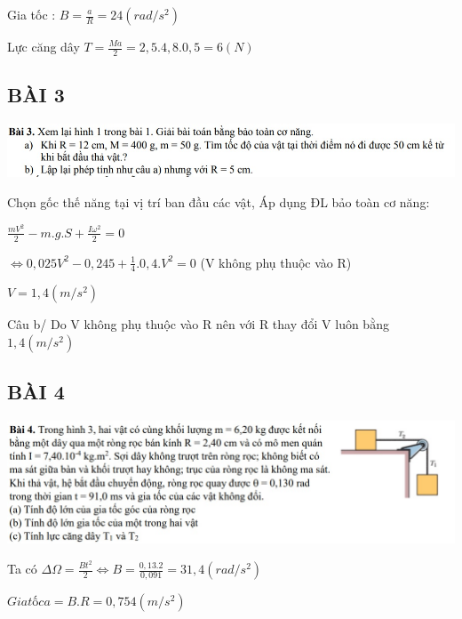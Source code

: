 \documentclass[12pt,a4paper]{article}
\begin{document}
\vspace*{1cm}
Gia tốc : $B = \frac{a}{R} = 24 (rad/s^2)$

\vspace*{1cm}
Lực căng dây $T = \frac{Ma}{2} = 2,5 . 4,8 . 0,5 = 6(N)$

\newpage
\vspace*{1cm}
\Large \subsection{\color{blue}\textbf{BÀI 3} }
\includegraphics[scale=0.80]{No4_3.jpg}

\vspace*{1cm}
Chọn gốc thế năng tại vị trí ban đầu các vật, Áp dụng ĐL bảo toàn cơ năng:

\vspace*{1cm}
$\frac{mV^2}{2} - m.g.S + \frac{I\omega^2}{2} = 0$

\vspace*{1cm}
$\Leftrightarrow 0,025V^2 - 0,245+ \frac{1}{4}.0,4.V^2 = 0$ (V không phụ thuộc vào R)

\vspace*{1cm}
$ V = 1,4 (m/s^2)$

\vspace*{1cm}
Câu b/ Do V không phụ thuộc vào R nên với R thay đổi V luôn bằng $1,4 (m/s^2)$

\Large \subsection{\color{blue}\textbf{BÀI 4} }
\includegraphics[scale=0.80]{No4_4.jpg}

\vspace*{1cm}
Ta có $\Delta\Omega =\frac{Bt^2}{2} \Leftrightarrow B = \frac{0,13 .2}{0,091} = 31,4 (rad/s^2)$

\vspace*{1cm}
$Gia tốc a = B.R = 0,754 (m/s^2)$
\end{document}
